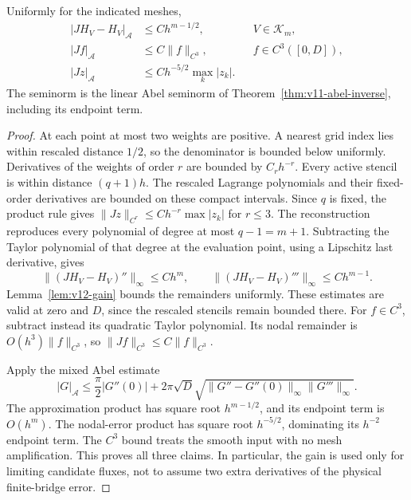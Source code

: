 \begin{lemma}
\label{lem:v12-reconstruction}
Uniformly for the indicated meshes,
\begin{align}
 |JH_V-H_V|_{\mathscr A}&\le C h^{m-1/2},
                                      &&V\in\mathcal K_m,
                                     \label{eq:v12-approx}\\
 |Jf|_{\mathscr A}&\le C\|f\|_{C^3},
                                      &&f\in C^3([0,D]),
                                     \label{eq:v12-bias}\\
 |Jz|_{\mathscr A}&\le Ch^{-5/2}\max_k|z_k|.
                                     \label{eq:v12-noise}
\end{align}
The seminorm is the linear Abel seminorm of
Theorem~\ref{thm:v11-abel-inverse}, including its endpoint term.
\end{lemma}
\begin{proof}
At each point at most two weights are positive. A nearest grid index
lies within rescaled distance $1/2$, so the denominator is bounded
below uniformly. Derivatives of the weights of order $r$ are bounded
by $C_rh^{-r}$. Every active stencil is within distance $(q+1)h$.
The rescaled Lagrange polynomials and their fixed-order derivatives
are bounded on these compact intervals. Since $q$ is fixed, the
product rule gives
$\|Jz\|_{C^r}\le Ch^{-r}\max|z_k|$ for $r\le3$.
The reconstruction reproduces every polynomial of degree at most
$q-1=m+1$. Subtracting the Taylor polynomial of that degree at
the evaluation point, using a Lipschitz last derivative, gives
\[
 \|(JH_V-H_V)''\|_\infty\le Ch^m,
 \qquad
 \|(JH_V-H_V)'''\|_\infty\le Ch^{m-1}.
\]
Lemma~\ref{lem:v12-gain} bounds the remainders uniformly. These
estimates are valid at zero and $D$, since the rescaled stencils
remain bounded there. For $f\in C^3$, subtract instead its quadratic
Taylor polynomial. Its nodal remainder is $O(h^3)\|f\|_{C^3}$,
so $\|Jf\|_{C^3}\le C\|f\|_{C^3}$.

Apply the mixed Abel estimate
\[
 |G|_{\mathscr A}\le\frac\pi2|G''(0)|+
  2\pi\sqrt D\sqrt{\|G''-G''(0)\|_\infty\|G'''\|_\infty}.
\]
The approximation product has square root $h^{m-1/2}$, and its
endpoint term is $O(h^m)$. The nodal-error product has square root
$h^{-5/2}$, dominating its $h^{-2}$ endpoint term. The $C^3$
bound treats the smooth input with no mesh amplification. This proves
all three claims. In particular, the gain is used only for limiting
candidate fluxes, not to assume two extra derivatives of the physical
finite-bridge error.
\end{proof}

